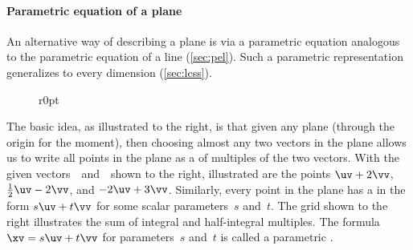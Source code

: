



\paragraph{Parametric equation of a plane}
An alternative way of describing a plane is via a parametric equation analogous to the parametric equation of a line (\cref{sec:pel}).
Such a parametric representation generalizes to every dimension (\cref{sec:lcss}).

\begin{wrapfigure}r{0pt}
\end{wrapfigure}
The basic idea, as illustrated to the right, is that given any plane (through the origin for the moment), then choosing almost any two vectors in the plane allows us to write all points in the plane as a  of multiples of the two vectors.
With the given vectors~\uv\ and~\vv\ shown to the right, illustrated are the points \(\uv+2\vv\), \(\tfrac12\uv-2\vv\), and \(-2\uv+3\vv\).
Similarly, every point in the plane has a  in the form \(s\uv+t\vv\) for some scalar parameters~\(s\) and~\(t\).
The grid shown to the right illustrates the sum of integral and half-integral multiples.
The formula \(\xv=s\uv+t\vv\) for parameters~\(s\) and~\(t\) is called a parametric .



